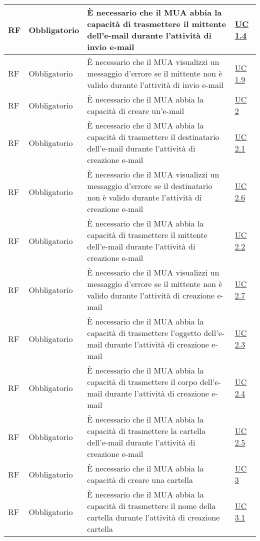 \begin{longtable}{*{1}{>{\centering\arraybackslash}p{1.5cm}}*{1}{>{\centering\arraybackslash}p{2.5cm}}p{6cm}*{1}{>{\centering\arraybackslash}p{3cm}}}
    \\\hline
    RF & Obbligatorio & È necessario che il MUA abbia la capacità di trasmettere il mittente dell'e-mail durante l'attività di invio e-mail & \hyperref[sec:UC1.4]{UC 1.4}
    \\\hline
    RF & Obbligatorio & È necessario che il MUA visualizzi un messaggio d'errore se il mittente non è valido durante l'attività di invio e-mail & \hyperref[sec:UC1.9]{UC 1.9}
    \\\hline
    RF & Obbligatorio & È necessario che il MUA abbia la capacità di creare un'e-mail & \hyperref[sec:UC2]{UC 2}
    \\\hline
    RF & Obbligatorio & È necessario che il MUA abbia la capacità di trasmettere il destinatario dell'e-mail durante l'attività di creazione e-mail & \hyperref[sec:UC2.1]{UC 2.1}
    \\\hline
    RF & Obbligatorio & È necessario che il MUA visualizzi un messaggio d'errore se il destinatario non è valido durante l'attività di creazione e-mail & \hyperref[sec:UC2.6]{UC 2.6}
    \\\hline
    RF & Obbligatorio & È necessario che il MUA abbia la capacità di trasmettere il mittente dell'e-mail durante l'attività di creazione e-mail & \hyperref[sec:UC2.2]{UC 2.2}
    \\\hline
    RF & Obbligatorio & È necessario che il MUA visualizzi un messaggio d'errore se il mittente non è valido durante l'attività di creazione e-mail & \hyperref[sec:UC2.7]{UC 2.7}
    \\\hline
    RF & Obbligatorio & È necessario che il MUA abbia la capacità di trasmettere l'oggetto dell'e-mail durante l'attività di creazione e-mail & \hyperref[sec:UC2.3]{UC 2.3}
    \\\hline
    RF & Obbligatorio & È necessario che il MUA abbia la capacità di trasmettere il corpo dell'e-mail durante l'attività di creazione e-mail & \hyperref[sec:UC2.4]{UC 2.4}
    \\\hline
    RF & Obbligatorio & È necessario che il MUA abbia la capacità di trasmettere la cartella dell'e-mail durante l'attività di creazione e-mail & \hyperref[sec:UC2.5]{UC 2.5}
    \\\hline
    RF & Obbligatorio & È necessario che il MUA abbia la capacità di creare una cartella & \hyperref[sec:UC3]{UC 3}
    \\\hline
    RF & Obbligatorio & È necessario che il MUA abbia la capacità di trasmettere il nome della cartella durante l'attività di creazione cartella & \hyperref[sec:UC3.1]{UC 3.1}

\end{longtable}

